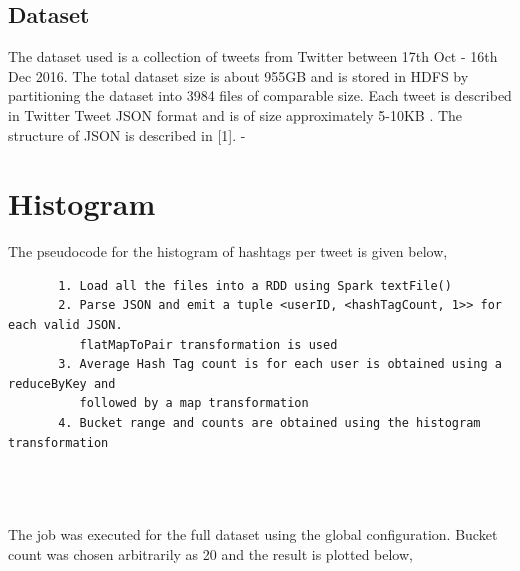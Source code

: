 \documentclass[11pt,a4paper,oneside]{article}
\begin{document}
    \subsection{Dataset}
    The dataset used is a collection of tweets from Twitter between 17th Oct - 16th Dec 2016. The total dataset size is about 955GB and is stored in HDFS by partitioning the dataset into 3984 files of comparable size. Each tweet is described in Twitter Tweet JSON format and is of size approximately 5-10KB . The structure of JSON is described in [1].
    -
    \section{Histogram}
    The pseudocode for the histogram of hashtags per tweet is given below,
    \begin{verbatim}
       1. Load all the files into a RDD using Spark textFile()
       2. Parse JSON and emit a tuple <userID, <hashTagCount, 1>> for each valid JSON.
          flatMapToPair transformation is used
       3. Average Hash Tag count is for each user is obtained using a reduceByKey and
          followed by a map transformation
       4. Bucket range and counts are obtained using the histogram transformation
       
       
       
    \end{verbatim}
    The job was executed for the full dataset using the global configuration. Bucket count was chosen arbitrarily as 20 and the result is plotted below,
    
\end{document}
